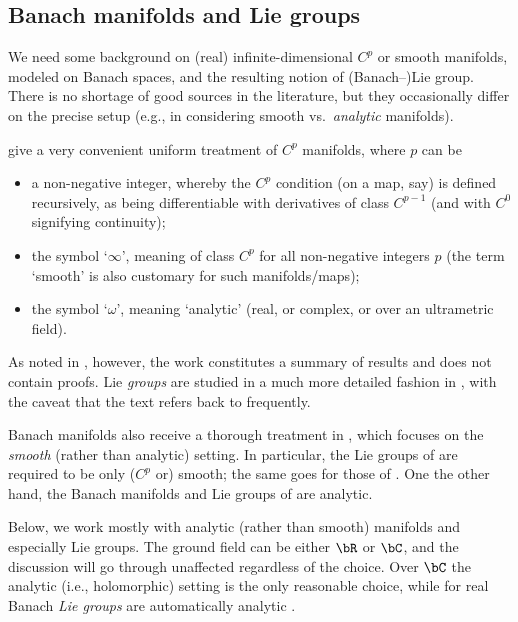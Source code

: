 \subsection{Banach manifolds and Lie groups}\label{subse:banmf}

We need some background on (real) infinite-dimensional $C^p$ or smooth manifolds, modeled on Banach spaces, and the resulting notion of (Banach--)Lie group. There is no shortage of good sources in the literature, but they occasionally differ on the precise setup (e.g., in considering smooth vs.\ {\it analytic} manifolds).

\cite{bourb-vars-17,bourb-vars-8-15} give a very convenient uniform treatment of $C^p$ manifolds, where $p$ can be
\begin{itemize}\itemsep=0pt
\item a non-negative integer, whereby the $C^p$ condition (on a map, say) is defined recursively, as being differentiable with derivatives of class $C^{p-1}$ (and with $C^0$ signifying continuity);

\item the symbol `$\infty$', meaning of class $C^p$ for all non-negative integers $p$ (the term `smooth' is also customary for such manifolds/maps);

\item the symbol `$\omega$', meaning `analytic' (real, or complex, or over an ultrametric field).
\end{itemize}
As noted in \cite[Avertissement]{bourb-vars-17}, however, the work constitutes a summary of results and does not contain proofs. Lie {\it groups} are studied in a much more detailed fashion in \cite[Chapter III]{bourb-lie-13}, with the caveat that the text refers back to \cite{bourb-vars-17,bourb-vars-8-15} frequently.

Banach manifolds also receive a thorough treatment in \cite{lang-fund}, which focuses on the {\it smooth} (rather than analytic) setting. In particular, the Lie groups of \cite[Section~VI.5]{lang-fund} are required to be only ($C^p$ or) smooth; the same goes for those of \cite[Definition IV.1]{neeb-inf}. One the other hand, the Banach manifolds \cite[Section~3]{upm-ban} and Lie groups of \cite[Section~6]{upm-ban} are analytic.

Below, we work mostly with analytic (rather than smooth) manifolds and especially Lie groups. The ground field can be either $\bR$ or $\bC$, and the discussion will go through unaffected regardless of the choice. Over $\bC$ the analytic (i.e., holomorphic) setting is the only reasonable choice, while for real Banach {\it Lie groups} are automatically analytic \cite[Corollary IV.1.10]{neeb-lc}.

